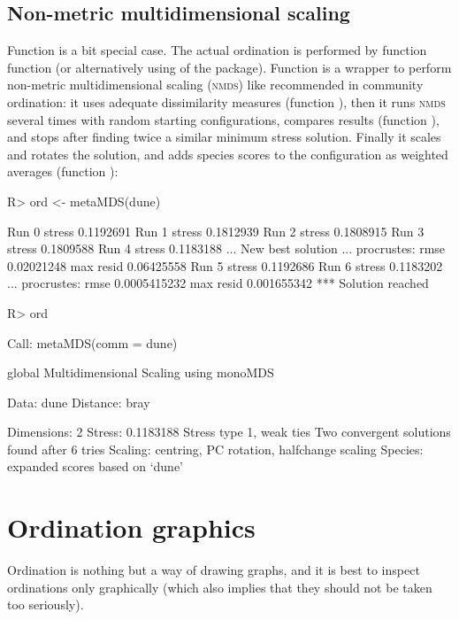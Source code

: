 \documentclass[article,nojss]{jss}
\begin{document}
\subsection{Non-metric multidimensional scaling}


Function  is a bit special case.  The actual ordination
is performed by function  function  (or
alternatively using  of the  package).
Function  is a wrapper to perform non-metric
multidimensional scaling (\textsc{nmds}) like recommended in community
ordination: it uses adequate dissimilarity measures (function
), then it runs \textsc{nmds} several times with random
starting configurations, compares results (function
), and stops after finding twice a similar minimum
stress solution.  Finally it scales and rotates the solution, and adds
species scores to the configuration as weighted averages (function
):
\begin{Schunk}
\begin{Sinput}
R> ord <- metaMDS(dune)
\end{Sinput}
\begin{Soutput}
Run 0 stress 0.1192691 
Run 1 stress 0.1812939 
Run 2 stress 0.1808915 
Run 3 stress 0.1809588 
Run 4 stress 0.1183188 
... New best solution
... procrustes: rmse 0.02021248  max resid 0.06425558 
Run 5 stress 0.1192686 
Run 6 stress 0.1183202 
... procrustes: rmse 0.0005415232  max resid 0.001655342 
*** Solution reached
\end{Soutput}
\begin{Sinput}
R> ord
\end{Sinput}
\begin{Soutput}
Call:
metaMDS(comm = dune) 

global Multidimensional Scaling using monoMDS

Data:     dune 
Distance: bray 

Dimensions: 2 
Stress:     0.1183188 
Stress type 1, weak ties
Two convergent solutions found after 6 tries
Scaling: centring, PC rotation, halfchange scaling 
Species: expanded scores based on ‘dune’ 
\end{Soutput}
\end{Schunk}

\section{Ordination graphics}

Ordination is nothing but a way of drawing graphs, and it is best to
inspect ordinations only graphically (which also implies that they
should not be taken too seriously).
\end{document}
